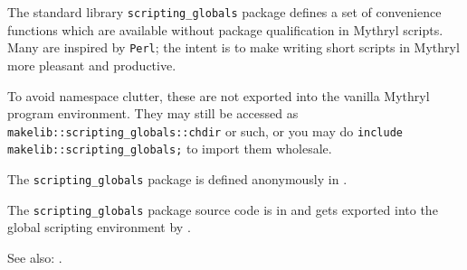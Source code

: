 
The standard library {\tt scripting\_globals} package defines a set of convenience functions 
which are available without package qualification in Mythryl scripts.  
Many are inspired by {\tt Perl}; the 
intent is to make writing short scripts in Mythryl more pleasant and productive.

To avoid 
namespace clutter, these are not exported into the vanilla Mythryl program 
environment.  They may still be accessed as {\tt makelib::scripting\_globals::chdir} 
or such, or you may do {\tt include makelib::scripting\_globals;} to import 
them wholesale.

The {\tt scripting\_globals} package is defined anonymously in 
.

The {\tt scripting\_globals} package source code is in 
and gets exported into the global scripting environment by 
 .

See also:  .


